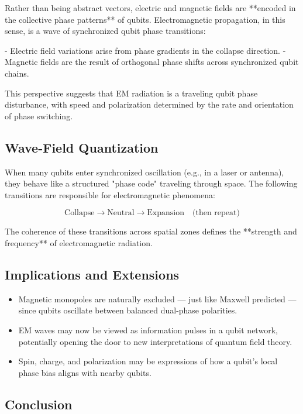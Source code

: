 \documentclass[12pt]{report} %
\begin{document}
Rather than being abstract vectors, electric and magnetic fields are **encoded in the collective phase patterns** of qubits. Electromagnetic propagation, in this sense, is a wave of synchronized qubit phase transitions:

- Electric field variations arise from phase gradients in the collapse direction.
- Magnetic fields are the result of orthogonal phase shifts across synchronized qubit chains.

This perspective suggests that EM radiation is a traveling qubit phase disturbance, with speed and polarization determined by the rate and orientation of phase switching.

\subsection*{Wave-Field Quantization}

When many qubits enter synchronized oscillation (e.g., in a laser or antenna), they behave like a structured "phase code" traveling through space. The following transitions are responsible for electromagnetic phenomena:

\[
\text{Collapse} \rightarrow \text{Neutral} \rightarrow \text{Expansion} \quad \text{(then repeat)}
\]

The coherence of these transitions across spatial zones defines the **strength and frequency** of electromagnetic radiation.

\subsection*{Implications and Extensions}

\begin{itemize}
  \item Magnetic monopoles are naturally excluded — just like Maxwell predicted — since qubits oscillate between balanced dual-phase polarities.
  \item EM waves may now be viewed as information pulses in a qubit network, potentially opening the door to new interpretations of quantum field theory.
  \item Spin, charge, and polarization may be expressions of how a qubit’s local phase bias aligns with nearby qubits.
\end{itemize}

\subsection*{Conclusion}
\end{document}
